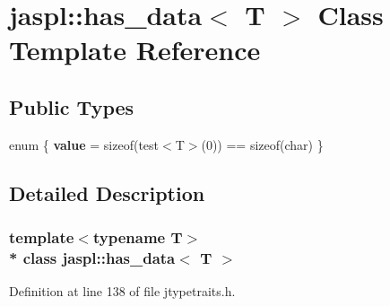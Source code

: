 \hypertarget{classjaspl_1_1has__data}{}\section{jaspl\+:\+:has\+\_\+data$<$ T $>$ Class Template Reference}
\label{classjaspl_1_1has__data}
\subsection*{Public Types}
\begin{DoxyCompactItemize}
\item 
enum \{ {\bfseries value} = sizeof(test$<$T$>$(0)) == sizeof(char)
 \}\hypertarget{classjaspl_1_1has__data_a70975109d44359f8d72c2d503fa99176}{}\label{classjaspl_1_1has__data_a70975109d44359f8d72c2d503fa99176}

\end{DoxyCompactItemize}


\subsection{Detailed Description}
\subsubsection*{template$<$typename T$>$\\*
class jaspl\+::has\+\_\+data$<$ T $>$}



Definition at line 138 of file jtypetraits.\+h.

